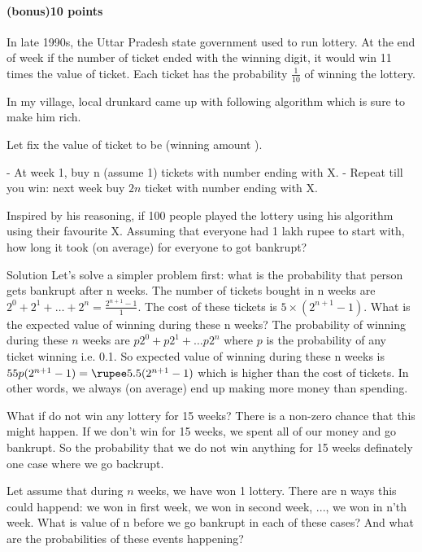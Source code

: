 \documentclass[a4paper,10pt]{article}
\renewcommand\footnote\marginpar
\begin{document}
\paragraph{(bonus)10 points}

In late 1990s, the Uttar Pradesh state government used to run lottery. At the
end of week if the number of ticket ended with the winning digit, it would win 11
times the value of ticket. Each ticket has the probability $\frac{1}{10}$ of
winning the lottery.

In my village, local drunkard  came up with following algorithm which is sure
to make him rich.

Let fix the value of ticket to be  (winning amount ).

- At week 1, buy n (assume 1) tickets with number ending with X.
- Repeat till you win: next week buy $2n$ ticket with number ending with X.

Inspired by his reasoning, if 100 people played the lottery using his algorithm
using their favourite X.  Assuming that everyone had 1 lakh rupee to start with,
how long it took (on average) for everyone to got bankrupt?

Solution Let's solve a simpler problem first: what is the probability that
person gets bankrupt after n weeks. The number of tickets bought in n weeks are
$2^0 + 2^1 + \ldots + 2^n = \frac{2^{n+1}-1}{1}$. The cost of these tickets is
\rupee $5 \times (2^{n+1}-1)$. What is the expected value of winning during
these n weeks? The probability of winning during these $n$ weeks are $p2^0 +
p2^1 + \ldots p2^n$ where $p$ is the probability of any ticket winning i.e. 0.1.
So expected value of winning during these n weeks is \rupee$55p(2^{n+1} -
1)=\text{\rupee} 5.5 (2^{n+1}-1)$ which is higher than the cost of tickets. In
other words, we always (on average) end up making more money than spending.
\footnote{What's wrong which this argument?}

What if do not win any lottery for 15 weeks? There is a non-zero chance that
this might happen. If we don't win for 15 weeks, we spent all of our money and
go bankrupt. So the probability that we do not win anything for 15 weeks
definately one case where we go backrupt. 

Let assume that during $n$ weeks, we have won 1 lottery. There are n ways this
could happend: we won in first week, we won in second week, ..., we won in n'th
week. What is value of n before we go bankrupt in each of these cases? And what
are the probabilities of these events happening?
\end{document}
